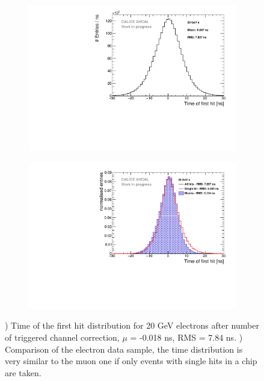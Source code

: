 \begin{figure}[htbp!]
	\begin{subfigure}[t]{0.5\textwidth}
		\centering
		\includegraphics[width=1\textwidth]{../Thesis_Plots/Timing/Electrons/Plots/Timing_AllLayers_20GeV.pdf}
		\caption{}\label{fig:timing_electrons_corr}
	\end{subfigure}
	\hfill
	\begin{subfigure}[t]{0.5\textwidth}
		\centering
		\includegraphics[width=1\textwidth]{../Thesis_Plots/Timing/Electrons/Plots/ComparisonAll_ElectronsSingleHit.pdf}
		\caption{}\label{fig:timing_electron_muon_comp}
	\end{subfigure}
	\caption{) Time of the first hit distribution for 20 GeV electrons after number of triggered channel correction, $\mu$ = -0.018 ns, RMS = 7.84 ns. ) Comparison of the electron data sample, the time distribution is very similar to the muon one if only events with single hits in a chip are taken.}
\end{figure}

